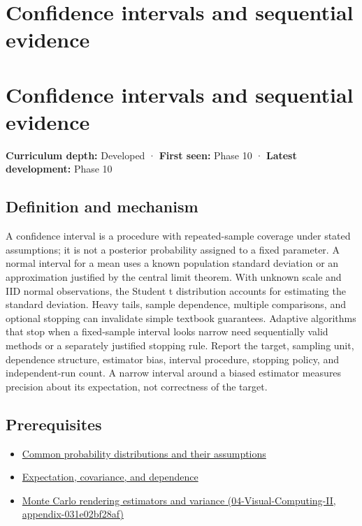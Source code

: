 \hypertarget{appendix-c83016554b1e}{}
\section*{Confidence intervals and sequential evidence}
\section{Confidence intervals and sequential evidence}\label{confidence-intervals-and-sequential-evidence}

\textbf{Curriculum depth:} Developed · \textbf{First seen:} Phase 10 · \textbf{Latest development:} Phase 10

\subsection{Definition and mechanism}\label{definition-and-mechanism}

A confidence interval is a procedure with repeated-sample coverage under stated assumptions; it is not a posterior probability assigned to a fixed parameter. A normal interval for a mean uses a known population standard deviation or an approximation justified by the central limit theorem. With unknown scale and IID normal observations, the Student t distribution accounts for estimating the standard deviation. Heavy tails, sample dependence, multiple comparisons, and optional stopping can invalidate simple textbook guarantees. Adaptive algorithms that stop when a fixed-sample interval looks narrow need sequentially valid methods or a separately justified stopping rule. Report the target, sampling unit, dependence structure, estimator bias, interval procedure, stopping policy, and independent-run count. A narrow interval around a biased estimator measures precision about its expectation, not correctness of the target.

\subsection{Prerequisites}\label{prerequisites}

\begin{itemize}
\tightlist
\item
  \hyperref[appendix-a2360b435383]{Common probability distributions and their assumptions}
\item
  \hyperref[appendix-54c383df9992]{Expectation, covariance, and dependence}
\item
  \href{}{Monte Carlo rendering estimators and variance (04-Visual-Computing-II, appendix-031e02bf28af)}
\end{itemize}

